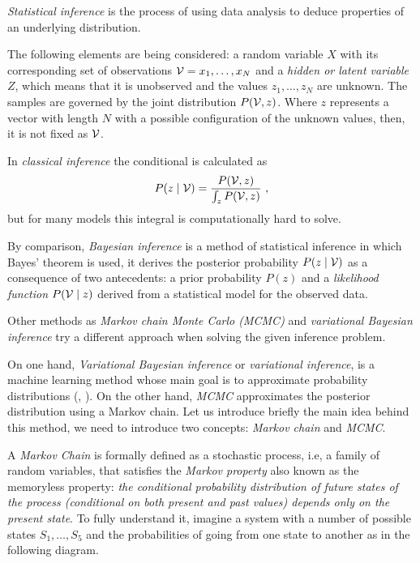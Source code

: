 
\emph{Statistical inference} is the process of using data analysis to deduce properties of an underlying distribution.

The following elements are being considered: a random variable \(X\) with its corresponding set of observations \(\mathcal{V} = x_{1},\dots, x_{N}\) and a \emph{hidden or latent variable} \(Z\), which means that it is unobserved and the values \(z_{1}, \dots, z_{N}\) are unknown. The samples are governed by the joint distribution \(P(\mathcal{V}, z)\). Where \(z\) represents a vector with length \(N\) with a possible configuration of the unknown values, then, it is not fixed as \(\mathcal{V}\).

In \emph{classical inference} the conditional is calculated as
\[
  P(z \mid \mathcal{V}) = \frac{P(\mathcal{V}, z)}{\int_{z} P(\mathcal{V},z)}\ ,
\]
but for many models this integral is computationally hard to solve.

By comparison, \emph{Bayesian inference} is a method of statistical inference in which Bayes' theorem is used, it derives the posterior probability \(P(z \mid \mathcal{V})\) as a consequence of two antecedents: a prior probability \(P(z)\) and a \emph{likelihood function} \(P(\mathcal{V} \mid z)\)  derived from a statistical model for the observed data.

Other methods as \emph{Markov chain Monte Carlo (MCMC)} and \emph{variational Bayesian inference} try a different approach when solving the given inference problem.

On one hand, \emph{Variational Bayesian inference} or \emph{variational inference}, is a machine learning method whose main goal is to approximate probability distributions (\cite{jordan1999introduction}, \cite{wainwright}). On the other hand, \emph{MCMC} approximates the posterior distribution using a Markov chain. Let us introduce briefly the main idea behind this method, we need to introduce two concepts: \emph{Markov chain} and \emph{MCMC}.

A \emph{Markov Chain} is formally defined as a stochastic process, i.e, a family of random variables, that satisfies the \emph{Markov property} also known as the memoryless property: \textit{the conditional probability distribution of future states of the process (conditional on both present and past values) depends only on the present state}. To fully understand it, imagine a system with a number of possible states \(S_{1},\dots,S_{5}\) and the probabilities of going from one state to another as in the following diagram.


